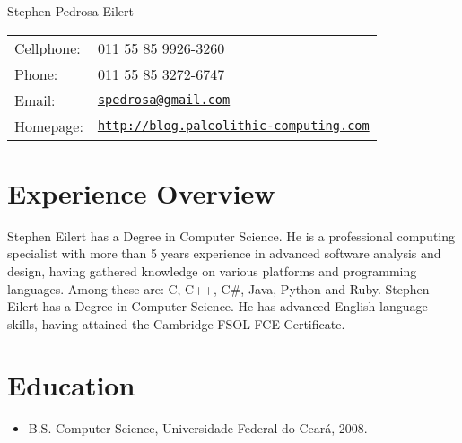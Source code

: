 \documentclass[letterpaper]{article}
\def\name{Stephen Pedrosa Eilert}
\begin{document}
\begin{flushright}

{\huge \name}


\vspace{0.25in}
\begin{minipage}{0.45\linewidth}
  \begin{tabular}{ll}
    Cellphone: & 011 55 85 9926-3260 \\
    Phone: &  011 55 85 3272-6747 \\
    Email: & \href{mailto:spedrosa@gmail.com}{\tt spedrosa@gmail.com} \\
    Homepage: & \href{http://blog.paleolithic-computing.com}{\tt http://blog.paleolithic-computing.com} \\
  \end{tabular}
\end{minipage}
\end{flushright}
\section*{Experience Overview}

Stephen Eilert has a Degree in Computer Science. He is a professional computing
specialist with more than 5 years experience in advanced software analysis and design,
having gathered knowledge on various platforms and programming languages. Among these
are: C, C++, C\#, Java, Python and Ruby.
Stephen Eilert has a Degree in Computer Science.
He has advanced English language skills, having attained the Cambridge FSOL FCE
Certificate.


\section*{Education}

\begin{itemize}
  \item B.S. Computer Science, Universidade Federal do Ceará, 2008.
\end{itemize}
\end{document}
